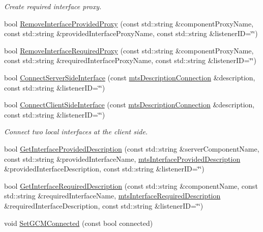 \begin{DoxyCompactItemize}
\begin{DoxyCompactList}\small\item\em Create required interface proxy. \end{DoxyCompactList}\item 
bool \hyperlink{classmts_manager_local_a741ff68bfb31dcfad6a3ec244f7d2227}{Remove\-Interface\-Provided\-Proxy} (const std\-::string \&component\-Proxy\-Name, const std\-::string \&provided\-Interface\-Proxy\-Name, const std\-::string \&listener\-I\-D=\char`\"{}\char`\"{})
\item 
bool \hyperlink{classmts_manager_local_ac58e53b7cb5f77daf8cdcfb6cc0d0e1e}{Remove\-Interface\-Required\-Proxy} (const std\-::string \&component\-Proxy\-Name, const std\-::string \&required\-Interface\-Proxy\-Name, const std\-::string \&listener\-I\-D=\char`\"{}\char`\"{})
\item 
bool \hyperlink{classmts_manager_local_aad3fbe9e5b41e75e55599f8f7d61b8f0}{Connect\-Server\-Side\-Interface} (const \hyperlink{classmts_description_connection}{mts\-Description\-Connection} \&description, const std\-::string \&listener\-I\-D=\char`\"{}\char`\"{})
\item 
bool \hyperlink{classmts_manager_local_af8f8d230b07f5d647b0e363f7e632160}{Connect\-Client\-Side\-Interface} (const \hyperlink{classmts_description_connection}{mts\-Description\-Connection} \&description, const std\-::string \&listener\-I\-D=\char`\"{}\char`\"{})
\begin{DoxyCompactList}\small\item\em Connect two local interfaces at the client side. \end{DoxyCompactList}\item 
bool \hyperlink{classmts_manager_local_ae131ad1d60cfa1b0abb675905251785a}{Get\-Interface\-Provided\-Description} (const std\-::string \&server\-Component\-Name, const std\-::string \&provided\-Interface\-Name, \hyperlink{classmts_interface_provided_description}{mts\-Interface\-Provided\-Description} \&provided\-Interface\-Description, const std\-::string \&listener\-I\-D=\char`\"{}\char`\"{})
\item 
bool \hyperlink{classmts_manager_local_a8056ed6c161b39b6492a671de76f71f2}{Get\-Interface\-Required\-Description} (const std\-::string \&component\-Name, const std\-::string \&required\-Interface\-Name, \hyperlink{classmts_interface_required_description}{mts\-Interface\-Required\-Description} \&required\-Interface\-Description, const std\-::string \&listener\-I\-D=\char`\"{}\char`\"{})
\item 
void \hyperlink{classmts_manager_local_af2a833e91816219c9e925e580c298182}{Set\-G\-C\-M\-Connected} (const bool connected)
\end{DoxyCompactItemize}
